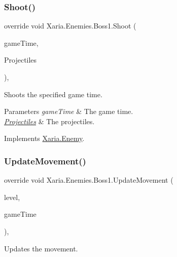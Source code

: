 \subsubsection{\texorpdfstring{Shoot()}{Shoot()}}
{\footnotesize\ttfamily override void Xaria.\+Enemies.\+Boss1.\+Shoot (\begin{DoxyParamCaption}\item[{Game\+Time}]{game\+Time,  }\item[{ref List$<$ \hyperlink{classXaria_1_1Projectile}{Projectile} $>$}]{Projectiles }\end{DoxyParamCaption})\hspace{0.3cm}{\ttfamily [inline]}, {\ttfamily [virtual]}}



Shoots the specified game time. 


\begin{DoxyParams}{Parameters}
{\em game\+Time} & The game time.\\
\hline
{\em \hyperlink{namespaceXaria_1_1Projectiles}{Projectiles}} & The projectiles.\\
\hline
\end{DoxyParams}


Implements \hyperlink{classXaria_1_1Enemy_a229b595e96e1429a9e9b1d9816d4370b}{Xaria.\+Enemy}.

\mbox{\label{classXaria_1_1Enemies_1_1Boss1_aed5d8f9843c47b9022104ea2de498830}} 
\subsubsection{\texorpdfstring{Update\+Movement()}{UpdateMovement()}}
{\footnotesize\ttfamily override void Xaria.\+Enemies.\+Boss1.\+Update\+Movement (\begin{DoxyParamCaption}\item[{\hyperlink{classXaria_1_1Level}{Level}}]{level,  }\item[{Game\+Time}]{game\+Time }\end{DoxyParamCaption})\hspace{0.3cm}{\ttfamily [inline]}, {\ttfamily [virtual]}}



Updates the movement. 


